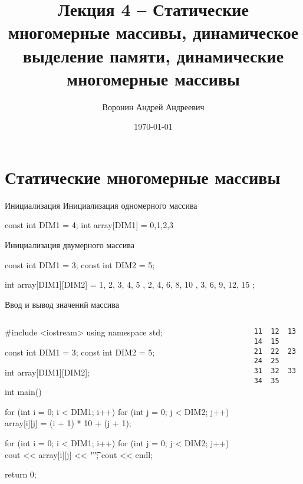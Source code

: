 \documentclass[
    9pt,
    hyperref={pdfencoding=unicode}
    ]{beamer}
\author{Воронин Андрей Андреевич}
\title{Лекция 4 – Статические многомерные массивы, динамическое выделение памяти, динамические многомерные массивы}
\institute{Кафедра прикладной математики и информатики}
\date{\today}
\theoremstyle{definition}
\begin{document}
\titlepage 
\section{Статические многомерные массивы}

\begin{frame}[fragile]{Инициализация}
    Инициализация одномерного массива
    \begin{cppcode}
        const int DIM1 = 4;
        int array[DIM1] = {0,1,2,3}
    \end{cppcode}
    
    Инициализация двумерного массива
    \begin{cppcode}
        const int DIM1 = 3;
        const int DIM2 = 5;
        
        int array[DIM1][DIM2] = {
            { 1, 2, 3, 4, 5 },
            { 2, 4, 6, 8, 10 },
            { 3, 6, 9, 12, 15 }
        };
    \end{cppcode}
    
\end{frame}

\begin{frame}[fragile]{Ввод и вывод значений массива}
    \footnotesize
    \begin{columns}
        \begin{column}{0.7\textwidth}
             \begin{cppcode}
                #include <iostream>        
                using namespace std;   
                
                const int DIM1 = 3;
                const int DIM2 = 5;
                
                int array[DIM1][DIM2];
                
                int main() {            
                    for (int i = 0; i < DIM1; i++) {
                        for (int j = 0; j < DIM2; j++) {
                            array[i][j] = (i + 1) * 10 + (j + 1);
                        }
                    }
                    
                    for (int i = 0; i < DIM1; i++) {
                        for (int j = 0; j < DIM2; j++) {
                            cout << array[i][j] << "\t";
                        }
                        cout << endl;
                    }
                    
                    return 0;
                }
            \end{cppcode}
        \end{column}
        \begin{column}{0.3\textwidth}
            \begin{verbatim}
11  12  13  14  15
21  22  23  24  25
31  32  33  34  35
            \end{verbatim}
        \end{column}
    \end{columns}
   
\end{frame}
\end{document}
